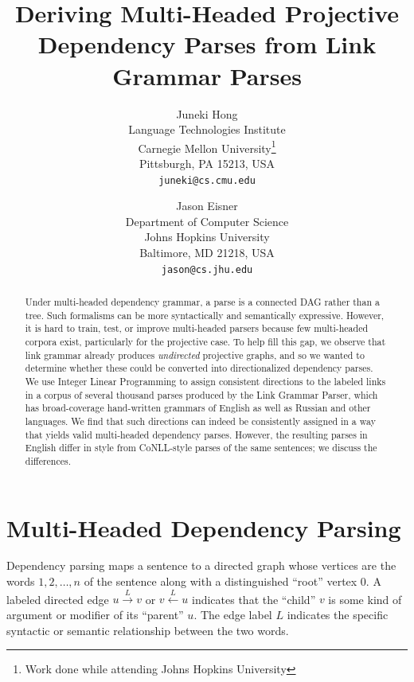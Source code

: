 \documentclass[a4paper,11pt]{article}
\title{Deriving Multi-Headed Projective Dependency Parses from Link Grammar Parses}
\author{
  Juneki Hong \\
  [0.5cm] Language Technologies Institute\\
  Carnegie Mellon University\thanks{Work done while attending Johns Hopkins University}\\
  Pittsburgh, PA 15213, USA\\
  {\texttt{juneki@cs.cmu.edu}}
  \and
  Jason Eisner\\
  [0.5cm] Department of Computer Science\\
  Johns Hopkins University\\
  Baltimore, MD 21218, USA \\
  {\texttt{jason@cs.jhu.edu}}
}
\date{}
\begin{document}
\maketitle

\begin{abstract}
\noindent
Under multi-headed dependency grammar, a parse is a connected DAG rather than a tree.  Such formalisms can be more syntactically and semantically expressive.  However, 
it is hard to train, test, or improve multi-headed parsers because few multi-headed corpora exist, particularly for the projective case.
To help fill this gap, we observe that link grammar already produces {\em undirected} projective graphs, and so we wanted to determine whether these could be converted into directionalized dependency parses.
We use Integer Linear Programming to assign consistent directions to the labeled links in a corpus of several thousand parses produced by the Link Grammar Parser, which has broad-coverage hand-written grammars of English as well as Russian and other languages.  We find that such directions can indeed be consistently assigned in a way that yields valid multi-headed dependency parses. 
However, the resulting parses in English differ in style from CoNLL-style parses of the same sentences; we discuss the differences. 


\end{abstract}

\thispagestyle{empty}


\section{Multi-Headed Dependency Parsing}

Dependency parsing maps a sentence to a directed graph whose vertices are the words $1, 2, \ldots, n$ of the sentence along with a distinguished ``root'' vertex 0.  A labeled directed edge $u \stackrel{L}{\rightarrow} v$ or $v \stackrel{L}{\leftarrow} u$ indicates that the ``child'' $v$ is some kind of argument or modifier of its ``parent'' $u$.  The edge label $L$ indicates the specific syntactic or semantic relationship between the two words.  
\end{document}
